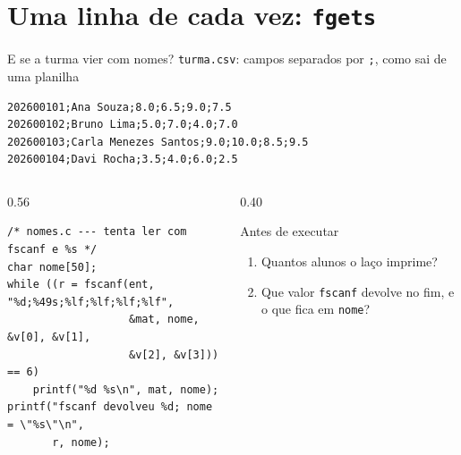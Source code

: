 \documentclass[aspectratio=169]{beamer}
\begin{document}
\section{Uma linha de cada vez: \texttt{fgets}}

\begin{frame}[fragile]{E se a turma vier com nomes?}
  \vspace{-0.3em}
  \texttt{turma.csv}: campos separados por \texttt{;}, como sai de uma planilha
\begin{lstlisting}[style=shellS]
202600101;Ana Souza;8.0;6.5;9.0;7.5
202600102;Bruno Lima;5.0;7.0;4.0;7.0
202600103;Carla Menezes Santos;9.0;10.0;8.5;9.5
202600104;Davi Rocha;3.5;4.0;6.0;2.5
\end{lstlisting}
  \begin{columns}[T]
    \begin{column}{0.56\textwidth}
\begin{lstlisting}[style=codC]
/* nomes.c --- tenta ler com fscanf e %s */
char nome[50];
while ((r = fscanf(ent, "%d;%49s;%lf;%lf;%lf;%lf",
                   &mat, nome, &v[0], &v[1],
                   &v[2], &v[3])) == 6)
    printf("%d %s\n", mat, nome);
printf("fscanf devolveu %d; nome = \"%s\"\n",
       r, nome);
\end{lstlisting}
    \end{column}
    \begin{column}{0.40\textwidth}
      \begin{block}{Antes de executar}
        \small
        \begin{enumerate}
          \item Quantos alunos o laço imprime?
          \item Que valor \texttt{fscanf} devolve no fim, e o que fica em
            \texttt{nome}?
        \end{enumerate}
      \end{block}
    \end{column}
  \end{columns}
\end{frame}
\end{document}
